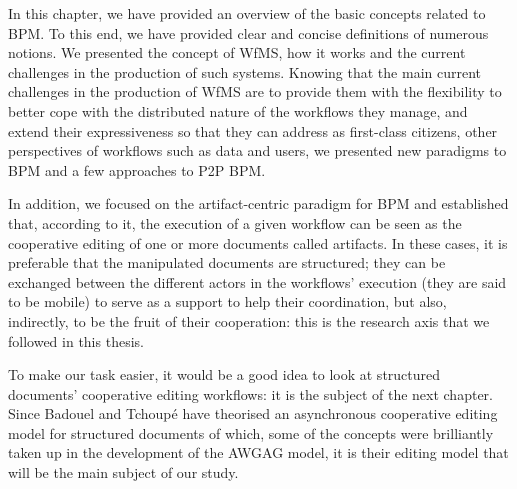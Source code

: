 \label{chap1:sec:summary}
In this chapter, we have provided an overview of the basic concepts related to BPM. To this end, we have provided clear and concise definitions of numerous notions. We presented the concept of WfMS, how it works and the current challenges in the production of such systems. Knowing that the main current challenges in the production of WfMS are to provide them with the flexibility to better cope with the distributed nature of the workflows they manage, and extend their expressiveness so that they can address as first-class citizens, other perspectives of workflows such as data and users, we presented new paradigms to BPM and a few approaches to P2P BPM.

In addition, we focused on the artifact-centric paradigm for BPM and established that, according to it, the execution of a given workflow can be seen as the cooperative editing of one or more documents called artifacts. In these cases, it is preferable that the manipulated documents are structured; they can be exchanged between the different actors in the workflows' execution (they are said to be mobile) to serve as a support to help their coordination, but also, indirectly, to be the fruit of their cooperation: this is the research axis that we followed in this thesis.

To make our task easier, it would be a good idea to look at structured documents' cooperative editing workflows: it is the subject of the next chapter. Since Badouel and Tchoup\'e have theorised an asynchronous cooperative editing model for structured documents of which, some of the concepts were brilliantly taken up in the development of the AWGAG model, it is their editing model that will be the main subject of our study.



